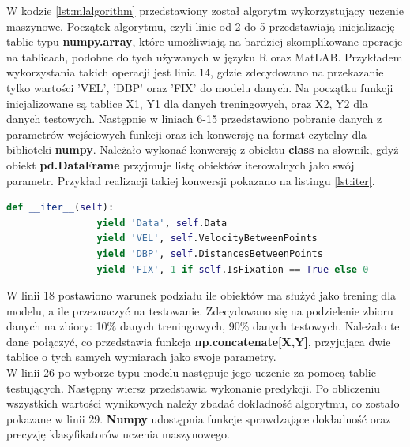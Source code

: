 W kodzie \ref{lst:mlalgorithm} przedstawiony został algorytm wykorzystujący uczenie maszynowe. Początek algorytmu, czyli linie od 2 do 5 przedstawiają inicjalizację tablic typu \textbf{numpy.array}, które umożliwiają na bardziej skomplikowane operacje na tablicach, podobne do tych używanych w języku R oraz MatLAB. Przykładem wykorzystania takich operacji jest linia 14, gdzie zdecydowano na przekazanie tylko wartości 'VEL', 'DBP' oraz 'FIX' do modelu danych. Na początku funkcji inicjalizowane są tablice X1, Y1 dla danych treningowych, oraz X2, Y2 dla danych testowych. Następnie w liniach 6-15 przedstawiono pobranie danych z parametrów wejściowych funkcji oraz ich konwersję na format czytelny dla biblioteki \textbf{numpy}. Należało wykonać konwersję z obiektu \textbf{class} na słownik, gdyż obiekt \textbf{pd.DataFrame} przyjmuje listę obiektów iterowalnych jako swój parametr. Przykład realizacji takiej konwersji pokazano na listingu \ref{lst:iter}.
\begin{lstlisting}[language=Python, caption=Iterator, label={lst:iter}]
        def __iter__(self):
                yield 'Data', self.Data
                yield 'VEL', self.VelocityBetweenPoints
                yield 'DBP', self.DistancesBetweenPoints
                yield 'FIX', 1 if self.IsFixation == True else 0
\end{lstlisting}
W linii 18 postawiono warunek podziału ile obiektów ma służyć jako trening dla modelu, a ile przeznaczyć na testowanie. Zdecydowano się na podzielenie zbioru danych na zbiory: 10\% danych treningowych, 90\% danych testowych. Należało te dane połączyć, co przedstawia funkcja \textbf{np.concatenate[X,Y]}, przyjująca dwie tablice o tych samych wymiarach jako swoje parametry.\\
W linii 26 po wyborze typu modelu następuje jego uczenie za pomocą tablic testujących. Następny wiersz przedstawia wykonanie predykcji. Po obliczeniu wszystkich wartości wynikowych należy zbadać dokładność algorytmu, co zostało pokazane w linii 29. \textbf{Numpy} udostępnia funkcje sprawdzające dokładność oraz precyzję klasyfikatorów uczenia maszynowego.
